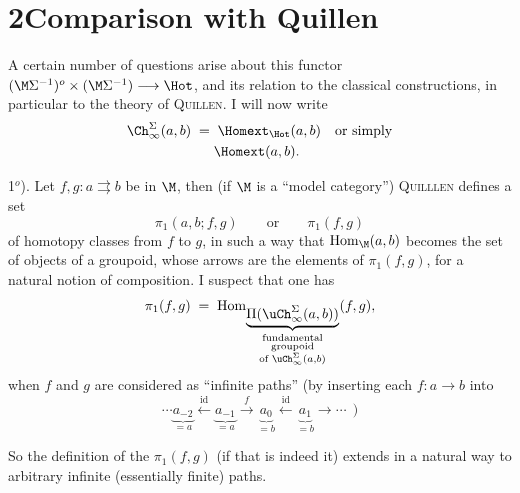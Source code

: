 

\section*{2\quad Comparison with Quillen}

A certain number of questions arise about this functor $(\M\Sigma^{-1})^o \times (\M\Sigma^{-1}) \longrightarrow \Hot$, and its relation to the classical constructions, in particular to the theory of \textsc{Quillen}. I will now write
\[
\begin{aligned}
\Ch^{\Sigma}_{\infty}(a,b) \;&=\; \Homext_{\Hot}(a,b) && \text{or simply}\\
&\phantom{\;=\;} \Homext(a,b).
\end{aligned}
\]

1$^o$). Let $f,g : a \rightrightarrows b$ be in $\M$, then (if $\M$ is a ``model category'') \textsc{Quilllen} defines a set %
\[
\pi_1(a,b;f,g) \qquad \text{or} \qquad \pi_1(f,g)
\]
of homotopy classes from $f$ to $g$, in such a way that $\mathrm{Hom}_{\M}(a,b)$ becomes the set of objects of a groupoid, whose arrows are the elements of $\pi_1(f,g)$, for a natural notion of composition. I suspect that one has
\[
\pi_1(f,g) \;=\; \mathrm{Hom}_{\underbrace{\Pi(\uCh^{\Sigma}_{\infty}(a,b))}_{\substack{\text{fundamental}\\ \text{groupoid}\\ \text{of } \uCh^{\Sigma}_{\infty}(a,b)}}}(f,g), %
\]
when $f$ and $g$ are considered as ``infinite paths'' (by inserting each $f : a \longrightarrow b$ into
\[
\cdots \underbrace{a_{-2}}_{=a} \xleftarrow{\ \mathrm{id}\ } \underbrace{a_{-1}}_{=a} \xrightarrow{\ f\ } \underbrace{a_{0}}_{=b} \xleftarrow{\ \mathrm{id}\ } \underbrace{a_{1}}_{=b} \longrightarrow \cdots\ \ )
\]


So the definition of the $\pi_1(f,g)$ (if that is indeed it) extends in a natural way to arbitrary infinite (essentially finite) paths.

